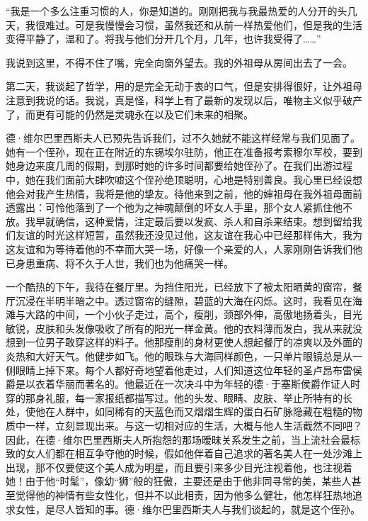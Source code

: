 \par “我是一个多么注重习惯的人，你是知道的。刚刚把我与我最热爱的人分开的头几天，我很难过。可是我慢慢会习惯，虽然我还和从前一样热爱他们，但是我的生活变得平静了，温和了。将我与他们分开几个月，几年，也许我受得了……”
\par 我说到这里，不得不住了嘴，完全向窗外望去。我的外祖母从房间出去了一会。
\par 第二天，我谈起了哲学，用的是完全无动于衷的口气，但是安排得很好，让外祖母注意到我说的话。我说，真是怪，科学上有了最新的发现以后，唯物主义似乎破产了，而更有可能的仍然是灵魂永在以及它们未来的相聚。
\par 德·维尔巴里西斯夫人已预先告诉我们，过不久她就不能这样经常与我们见面了。她有一个侄孙，现在正在附近的东锡埃尔驻防，他正在准备报考索穆尔军校，要到她身边来度几周的假期，到那时她的许多时间都要给她侄孙了。在我们出游过程中，她在我们面前大肆吹嘘这个侄孙绝顶聪明，心地是特别善良。我心里已经设想他会对我产生热情，我将是他的挚友。待他来到之前，他的婶祖母在我外祖母面前透露出：可怜他落到了一个他为之神魂颠倒的坏女人手里，那个女人紧抓住他不放。我早就确信，这种爱情，注定最后要以发疯、杀人和自杀来结束。想到留给我们友谊的时光这样短暂，虽然我还没见过他，这友谊在我心中已经那样伟大，我为这友谊和为等待着他的不幸而大哭一场，好像一个亲爱的人，人家刚刚告诉我们他已身患重病、将不久于人世，我们也为他痛哭一样。
\par 一个酷热的下午，我待在餐厅里。为挡住阳光，已经放下了被太阳晒黄的窗帘，餐厅沉浸在半明半暗之中。透过窗帘的缝隙，碧蓝的大海在闪烁。这时，我看见在海滩与大路的中间，一个小伙子走过，高个，瘦削，颈部外伸，高傲地扬着头，目光敏锐，皮肤和头发像吸收了所有的阳光一样金黄。他的衣料薄而发白，我从来就没想到一位男子敢穿这样的料子。他那瘦削的身材更使人想起餐厅的凉爽以及外面的炎热和大好天气。他健步如飞。他的眼珠与大海同样颜色，一只单片眼镜总是从一侧眼睛上掉下来。每个人都好奇地望着他走过，人们知道这位年轻的圣卢昂布雷侯爵是以衣着华丽而著名的。他最近在一次决斗中为年轻的德·于塞斯侯爵作证人时穿的那身礼服，每一家报纸都描写过。他的头发、眼睛、皮肤、举止所特有的长处，使他在人群中，如同稀有的天蓝色而又熠熠生辉的蛋白石矿脉隐藏在粗糙的物质中一样，立刻显现出来。与这一切相对应的生活，大概与他人生活截然不同吧？因此，在德·维尔巴里西斯夫人所抱怨的那场暧昧关系发生之前，当上流社会最标致的女人们都在相互争夺他的时候，假如他伴着自己追求的著名美人在一处沙滩上出现，那不仅要使这个美人成为明星，而且要引来多少目光注视着他，也注视着她！由于他“时髦”，像幼“狮”般的狂傲，主要还是由于他非同寻常的美，某些人甚至觉得他的神情有些女性化，但并不以此相责，因为他多么健壮，他怎样狂热地追求女性，是尽人皆知的事。德·维尔巴里西斯夫人与我们谈起的，就是这个侄孙。
